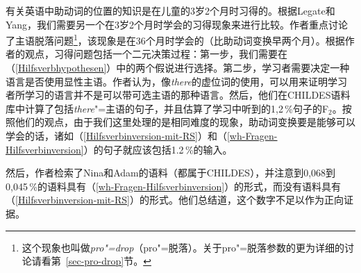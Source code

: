 \noindent
有关英语中助动词的位置的知识是在儿童的3岁2个月时习得的。根据Legate和Yang，我们需要另一个在3岁2个月时学会的习得现象来进行比较。作者重点讨论了主语脱落问题\footnote{
这个现象也叫做\emph{pro"=drop}（pro"=脱落）。关于pro"=脱落参数的更为详细的讨论请看第~\ref{sec-pro-drop}节。
}，该现象是在36个月时学会的（比助动词变换早两个月）。根据作者的观点，习得问题包括一个二元决策过程：第一步，我们需要在（\ref{Hilfsverbhypothesen}）中的两个假说进行选择。第二步，学习者需要决定一种语言是否使用显性主语。作者认为，像\emph{there}的虚位词的使用，可以用来证明学习者所学习的语言并不是可以带可选主语的那种语言。然后，他们在CHILDES语料库中计算了包括\emph{there}"=主语的句子，并且估算了学习中听到的1,2\,\%句子的F$_2$。按照他们的观点，由于我们这里处理的是相同难度的现象，助动词变换要是能够可以学会的话，诸如（\ref{Hilfsverbinversion-mit-RS}）和（\ref{wh-Fragen-Hilfsverbinversion}）的句子就应该包括1.2\,\%的输入。

然后，作者检索了Nina和Adam的语料（都属于CHILDES），并注意到0,068到0,045\,\%的语料具有（\ref{wh-Fragen-Hilfsverbinversion}）的形式，而没有语料具有（\ref{Hilfsverbinversion-mit-RS}）的形式。他们总结道，这个数字不足以作为正向证据。

